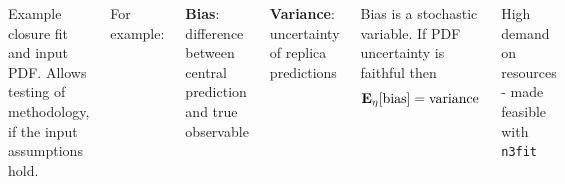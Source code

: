 \begin{frame}
\begin{columns}[t]
    Example closure fit and input PDF.
    \reqnomode
    Allows testing of methodology, if the input assumptions hold.

    \vspace{8pt}
    For example:
    \vspace{8pt}
    
    \textbf{Bias}: difference between central prediction and true observable

    \vspace{8pt}
    \textbf{Variance}: uncertainty of replica predictions

    \vspace{8pt}
    
    Bias is a stochastic variable. If PDF uncertainty is faithful then
    \begin{equation}
        \mathbf{E}_{\eta}[{\rm bias}] = {\rm variance}
    \end{equation}

    \vspace{8pt}
    
    High demand on resources - made feasible with \texttt{n3fit}
    \end{columns}
\end{frame}
%
